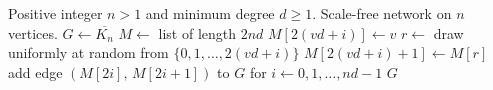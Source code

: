 
\begin{algorithmic}[1]
\Require Positive integer $n > 1$ and minimum degree $d \geq 1$.
\Ensure Scale-free network on $n$ vertices.
\State $G \gets \overline{K_n}$
\State $M \gets$ list of length $2nd$
    \State $M[2(vd + i)] \gets v$
    \State $r \gets$ draw uniformly at random from $\{0, 1, \dots, 2(vd + i)\}$
    \State $M[2(vd + i) + 1] \gets M[r]$
  \EndFor
\EndFor
\State add edge $(M[2i],\, M[2i+1])$ to $G$ for $i \gets 0, 1, \dots, nd-1$
\State \Return $G$
\end{algorithmic}
